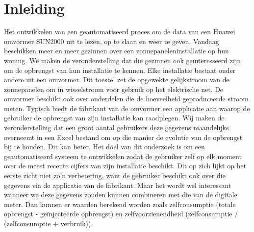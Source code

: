 \documentclass{hogent-article}
\affiliation{
  \textsuperscript{1} \href{mailto:bart.depaepe@student.hogent.be}{bart.depaepe@student.hogent.be}}
\begin{document}
\flushbottom %
\maketitle %
\tableofcontents %
\thispagestyle{empty} %


\section{Inleiding}

Het ontwikkelen van een geautomatiseerd proces om de data van een Huawei omvormer SUN2000 uit te lezen, op te slaan en weer te geven. Vandaag beschikken meer en meer gezinnen over een zonnepaneleninstallatie op hun woning. We maken de veronderstelling dat die gezinnen ook geïnteresseerd zijn om de opbrengst van hun installatie te kennen. Elke installatie bestaat onder andere uit een omvormer. Dit toestel zet de opgewekte gelijkstroom van de zonnepanelen om in wisselstroom voor gebruik op het elektrische net. De omvormer beschikt ook over onderdelen die de hoeveelheid geproduceerde stroom meten. Typisch biedt de fabrikant van de omvormer een applicatie aan waarop de gebruiker de opbrengst van zijn installatie kan raadplegen. Wij maken de veronderstelling dat een groot aantal gebruikers deze gegevens maandelijks overneemt in een Excel bestand om op die manier de evolutie van de opbrengst bij te houden.
Dit kan beter. Het doel van dit onderzoek is om een geautomatiseerd systeem te ontwikkelen zodat de gebruiker zelf op elk moment over de meest recente cijfers van zijn installatie beschikt. Dit op zich lijkt op het eerste zicht niet zo'n verbetering, want de gebruiker beschikt ook over die gegevens via de applicatie van de fabrikant. Maar het wordt wel interessant wanneer we deze gegevens zouden kunnen combineren met die van de digitale meter. Dan kunnen er waarden berekend worden zoals zelfconsumptie (totale opbrengst - geïnjecteerde opbrengst) en zelfvoorzienendheid (zelfconsumptie / (zelfconsumptie + verbruik)).
\end{document}
